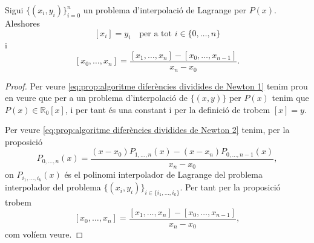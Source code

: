 \documentclass[../Apunts.tex]{subfiles}
\begin{document}
	\begin{proposition}\label{prop:algoritme diferències dividides de Newton}
		Sigui \(\{(x_{i},y_{i})\}_{i=0}^{n}\) un problema d'interpolació de Lagrange per \(P(x)\). Aleshores
		\begin{equation}\label{eq:prop:algoritme diferències dividides de Newton 1}
		[x_{i}]=y_{i}\quad\text{per a tot }i\in\{0,\dots,n\}
		\end{equation}
		i
		\begin{equation}\label{eq:prop:algoritme diferències dividides de Newton 2}
		[x_{0},\dots,x_{n}]=\frac{[x_{1},\dots,x_{n}]-[x_{0},\dots,x_{n-1}]}{x_{n}-x_{0}}.
		\end{equation}
	\end{proposition}
	\begin{proof}
		Per veure \eqref{eq:prop:algoritme diferències dividides de Newton 1} tenim prou en veure que per a un problema d'interpolació de \(\{(x,y)\}\) per \(P(x)\) tenim que \(P(x)\in\mathbb{R}_{0}[x]\), i per tant és una constant i per la definició de  trobem \([x]=y\).
		
		Per veure \eqref{eq:prop:algoritme diferències dividides de Newton 2} tenim, per la proposició 
		\[P_{0,\dots,n}(x)=\frac{\left(x-x_{0}\right)P_{1,\dots,n}(x)-\left(x-x_{n}\right)P_{0,\dots,n-1}(x)}{x_{n}-x_{0}},\]
		on \(P_{i_{1},\dots,i_{k}}(x)\) és el polinomi interpolador de Lagrange del problema interpolador del problema \(\{(x_{i},y_{i})\}_{i\in\{i_{1},\dots,i_{k}\}}\). Per tant per la proposició  trobem %
		\[[x_{0},\dots,x_{n}]=\frac{[x_{1},\dots,x_{n}]-[x_{0},\dots,x_{n-1}]}{x_{n}-x_{0}},\]
		com volíem veure.
	\end{proof}
\end{document}

